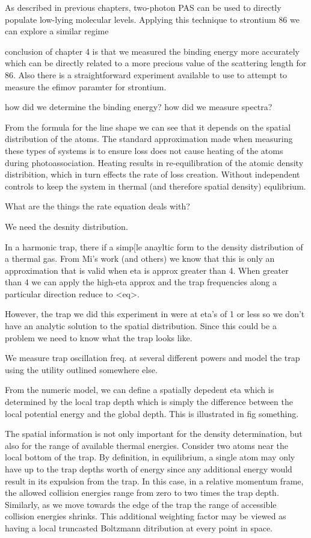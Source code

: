 As described in previous chapters, two-photon PAS can be used to directly populate low-lying molecular levels. Applying this technique to strontium 86 we can explore a similar regime



conclusion of chapter 4 is that we measured the binding energy more accurately which can be directly related to a more precious value of the scattering length for 86. Also there is a straightforward experiment available to use to attempt to measure the efimov paramter for strontium.

how did we determine the binding energy? how did we measure spectra?



From the formula for the line shape we can see that it depends on the spatial distribution of the atoms. The standard approximation made when measuring these types of systems is to ensure loss does not cause heating of the atoms during photoassociation. Heating results in re-equilibration of the atomic density distribition, which in turn effects the rate of loss creation. Without independent controls to keep the system in thermal (and therefore spatial density) equlibrium.

What are the things the rate equation deals with?

We need the desnity distribution.

In a harmonic trap, there if a simp[le anayltic form to the density distribution of a thermal gas. From Mi's work (and others) we know that this is only an approximation that is valid when eta is approx greater than 4. When greater than 4 we can apply the high-eta approx and the trap frequencies along a particular direction reduce to <eq>.

However, the trap we did this experiment in were at eta's of 1 or less so we don't have an analytic solution to the spatial distribution. Since this could be a problem we need to know what the trap looks like.

We measure trap oscillation freq. at several different powers and model the trap using the utility outlined somewhere else.

From the numeric model, we can define a spatially depedent eta which is determined by the local trap depth which is simply the difference between the local potential energy and the global depth. This is illustrated in fig something.

The spatial information is not only important for the density determination, but also for the range of available thermal energies. Consider two atoms near the local bottom of the trap. By definition, in equilibrium, a single atom may only have up to the trap depths worth of energy since any additional energy would result in its expulsion from the trap. In this case, in a relative momentum frame, the allowed collision energies range from zero to two times the trap depth. Similarly, as we move towards the edge of the trap the range of accessible collision energies shrinks. This additional weighting factor may be viewed as having a local truncasted Boltzmann ditribution at every point in space. 

